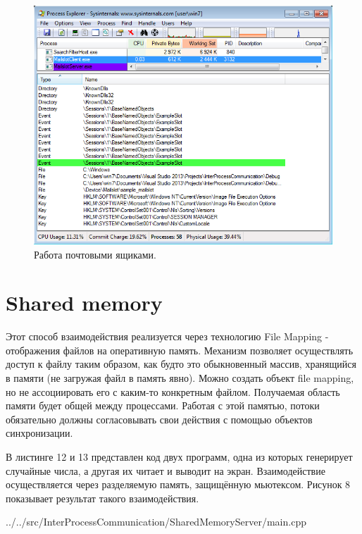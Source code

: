 \documentclass[a4paper, 12pt]{report}		%
\begin{document}
\begin{figure}[h!]
\centering
\includegraphics[scale=0.75]{res/07_Process_Explorer}
\caption{Работа почтовыми ящиками.}
\end{figure}


\chapter*{Shared memory}

Этот способ взаимодействия реализуется через технологию File Mapping - отображения файлов на оперативную память. Механизм позволяет осуществлять доступ к файлу таким образом, как будто это обыкновенный массив, хранящийся в памяти (не загружая файл в память явно). Можно создать объект file mapping, но не ассоциировать его с каким-то конкретным файлом. Получаемая область памяти будет общей между процессами. Работая с этой памятью, потоки обязательно должны согласовывать свои действия с помощью объектов синхронизации.

В листинге 12 и 13 представлен код двух программ, одна из которых генерирует случайные числа, а другая их читает и выводит на экран. Взаимодействие осуществляется через разделяемую память, защищённую мьютексом. Рисунок 8 показывает результат такого взаимодействия.


{../../src/InterProcessCommunication/SharedMemoryServer/main.cpp}
\end{document}

